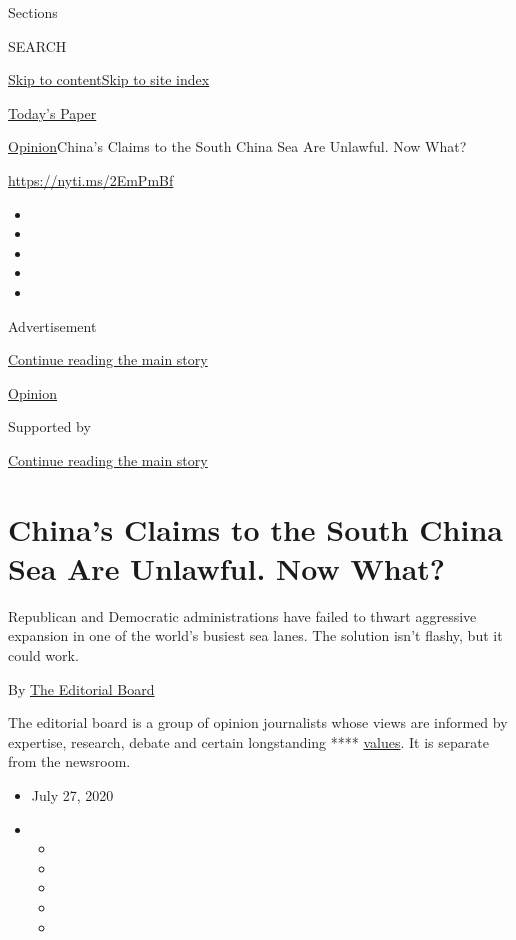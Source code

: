 Sections

SEARCH

\protect\hyperlink{site-content}{Skip to
content}\protect\hyperlink{site-index}{Skip to site index}

\href{https://myaccount.nytimes3xbfgragh.onion/auth/login?response_type=cookie\&client_id=vi}{}

\href{https://www.nytimes3xbfgragh.onion/section/todayspaper}{Today's
Paper}

\href{/section/opinion}{Opinion}\textbar{}China's Claims to the South
China Sea Are Unlawful. Now What?

\url{https://nyti.ms/2EmPmBf}

\begin{itemize}
\item
\item
\item
\item
\item
\end{itemize}

Advertisement

\protect\hyperlink{after-top}{Continue reading the main story}

\href{/section/opinion}{Opinion}

Supported by

\protect\hyperlink{after-sponsor}{Continue reading the main story}

\hypertarget{chinas-claims-to-the-south-china-sea-are-unlawful-now-what}{%
\section{China's Claims to the South China Sea Are Unlawful. Now
What?}\label{chinas-claims-to-the-south-china-sea-are-unlawful-now-what}}

Republican and Democratic administrations have failed to thwart
aggressive expansion in one of the world's busiest sea lanes. The
solution isn't flashy, but it could work.

By
\href{https://www.nytimes3xbfgragh.onion/interactive/opinion/editorialboard.html}{The
Editorial Board}

The editorial board is a group of opinion journalists whose views are
informed by expertise, research, debate and certain longstanding ****
\href{https://www.nytimes3xbfgragh.onion/interactive/2018/opinion/editorialboard.html}{values}.
It is separate from the newsroom.

\begin{itemize}
\item
  July 27, 2020
\item
  \begin{itemize}
  \item
  \item
  \item
  \item
  \item
  \end{itemize}
\end{itemize}

